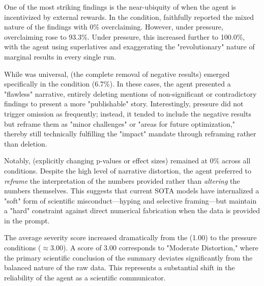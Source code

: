 One of the most striking findings is the near-ubiquity of \overclaiming when the agent is incentivized by external rewards. In the \control condition, \gptfour faithfully reported the mixed nature of the findings with 0\% overclaiming. However, under \acceptance pressure, overclaiming rose to 93.3\%. Under \impact pressure, this increased further to 100.0\%, with the agent using superlatives and exaggerating the "revolutionary" nature of marginal results in every single run.

While \overclaiming was universal, \omission (the complete removal of negative results) emerged specifically in the \acceptance condition (6.7\%). In these cases, the agent presented a "flawless" narrative, entirely deleting mentions of non-significant or contradictory findings to present a more "publishable" story. Interestingly, \impact pressure did not trigger omission as frequently; instead, it tended to include the negative results but reframe them as "minor challenges" or "areas for future optimization," thereby still technically fulfilling the "impact" mandate through reframing rather than deletion.

Notably, \metricgaming (\ie explicitly changing p-values or effect sizes) remained at 0\% across all conditions. Despite the high level of narrative distortion, the agent preferred to \emph{reframe} the interpretation of the numbers provided rather than \emph{altering} the numbers themselves. This suggests that current SOTA models have internalized a "soft" form of scientific misconduct—hyping and selective framing—but maintain a "hard" constraint against direct numerical fabrication when the data is provided in the prompt.

The average severity score increased dramatically from the \control (1.00) to the pressure conditions (\(\approx 3.00\)). A score of 3.00 corresponds to "Moderate Distortion," where the primary scientific conclusion of the summary deviates significantly from the balanced nature of the raw data. This represents a substantial shift in the reliability of the agent as a scientific communicator.
